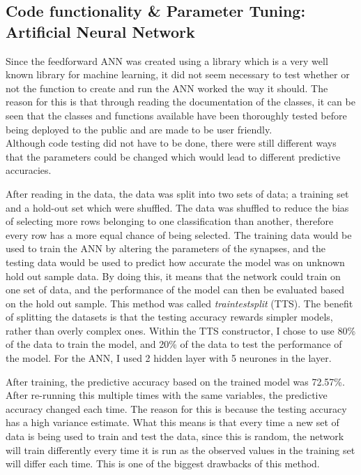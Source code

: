 \documentclass[11pt]{article}
\begin{document}
\subsection{Code functionality \& Parameter Tuning: Artificial Neural Network}
Since the feedforward ANN was created using a library which is a very well known library for machine learning, it did not seem necessary to test whether or not the function to create and run the ANN worked the way it should. The reason for this is that through reading the documentation of the classes, it can be seen that the classes and functions available have been thoroughly tested before being deployed to the public and are made to be user friendly. \\

Although code testing did not have to be done, there were still different ways that the parameters could be changed which would lead to different predictive accuracies. 

After reading in the data, the data was split into two sets of data;  a training set and a hold-out set which were shuffled. The data was shuffled to reduce the bias of selecting more rows belonging to one classification than another, therefore every row has a more equal chance of being selected.  The training data would be used to train the ANN by altering the parameters of the synapses, and the testing data would be used to predict how accurate the model was on unknown hold out sample data. By doing this, it means that the network could train on one set of data, and the performance of the model can then be evaluated based on the hold out sample. This method was called \textit{train\textunderscore test\textunderscore split} (TTS). The benefit of splitting the datasets is that the testing accuracy rewards simpler models, rather than overly complex ones. 
Within the TTS constructor, I chose to use 80\% of the data to train the model, and 20\% of the data to test the performance of the model. For the ANN, I used 2 hidden layer with 5 neurones in the layer.

After training, the predictive accuracy based on the trained model was 72.57\%. After re-running this multiple times with the same variables, the predictive accuracy changed each time. The reason for this is because the testing accuracy has a high variance estimate. What this means is that every time a new set of data is being used to train and test the data, since this is random, the network will train differently every time it is run as the observed values in the training set will differ each time. This is one of the biggest drawbacks of this method. 
\end{document}
